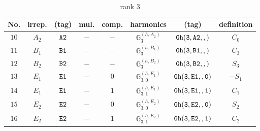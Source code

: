 \documentclass[fleqn,8pt]{jsarticle}
\begin{document}
\begin{table}[ht!]
\begin{center}
\caption{rank 3}
\renewcommand{\arraystretch}{1.3}
\begin{tabular}{cccccccc} \hline \hline
No. & irrep. & (tag) & mul. & comp. & harmonics & (tag) & definition \\ \hline
$ 10 $ & $ A_{2} $ & $ {\tt A2} $ & $ - $ & $ - $ & $ \mathbb{G}_{3}^{(h,A_{2})} $ & $ {\tt Gh(3,A2,,)} $ & $ C_{0} $ \\
$ 11 $ & $ B_{1} $ & $ {\tt B1} $ & $ - $ & $ - $ & $ \mathbb{G}_{3}^{(h,B_{1})} $ & $ {\tt Gh(3,B1,,)} $ & $ C_{3} $ \\
$ 12 $ & $ B_{2} $ & $ {\tt B2} $ & $ - $ & $ - $ & $ \mathbb{G}_{3}^{(h,B_{2})} $ & $ {\tt Gh(3,B2,,)} $ & $ S_{3} $ \\
$ 13 $ & $ E_{1} $ & $ {\tt E1} $ & $ - $ & $ 0 $ & $ \mathbb{G}_{3,0}^{(h,E_{1})} $ & $ {\tt Gh(3,E1,,0)} $ & $ - S_{1} $ \\
$ 14 $ & $ E_{1} $ & $ {\tt E1} $ & $ - $ & $ 1 $ & $ \mathbb{G}_{3,1}^{(h,E_{1})} $ & $ {\tt Gh(3,E1,,1)} $ & $ C_{1} $ \\
$ 15 $ & $ E_{2} $ & $ {\tt E2} $ & $ - $ & $ 0 $ & $ \mathbb{G}_{3,0}^{(h,E_{2})} $ & $ {\tt Gh(3,E2,,0)} $ & $ S_{2} $ \\
$ 16 $ & $ E_{2} $ & $ {\tt E2} $ & $ - $ & $ 1 $ & $ \mathbb{G}_{3,1}^{(h,E_{2})} $ & $ {\tt Gh(3,E2,,1)} $ & $ C_{2} $ \\
 \hline \hline
\end{tabular}
\end{center}
\end{table}
\end{document}
